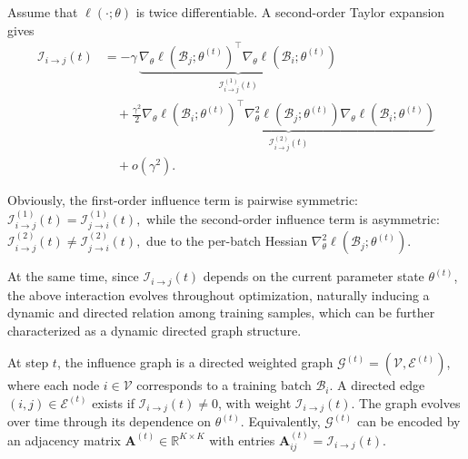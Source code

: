 \begin{tcolorbox}[colback=lightpurple, colframe=lightpurple, sharp corners=all, boxrule=0mm, boxsep=0.5mm, left=1.5mm, right=1.5mm, top=1.5mm, bottom=1.5mm]
\begin{proposition}
\label{prop:influence_properties}
Assume that $\ell(\cdot;\theta)$ is twice differentiable. 
A second-order Taylor expansion gives
{\small
\begin{equation*}
    \begin{aligned} \mathcal{I}_{i \to j}(t) &= -\gamma \, \underbrace{\nabla_\theta \ell(\mathcal{B}_j;\theta^{(t)})^\top \nabla_\theta \ell(\mathcal{B}_i;\theta^{(t)})}_{\mathcal{I}_{i \to j}^{(1)}(t)} \\ &\quad + \frac{\gamma^2}{2} \underbrace{\nabla_\theta \ell(\mathcal{B}_i;\theta^{(t)})^\top \nabla_\theta^2 \ell(\mathcal{B}_j;\theta^{(t)}) \nabla_\theta \ell(\mathcal{B}_i;\theta^{(t)})}_{\mathcal{I}_{i \to j}^{(2)}(t) }\\ &\quad+ o(\gamma^2). \end{aligned}
\end{equation*}
}
\end{proposition} 
\end{tcolorbox}
Obviously, the first-order influence term is pairwise symmetric: 
\(
\mathcal{I}_{i \to j}^{(1)}(t) = \mathcal{I}_{j \to i}^{(1)}(t),
\)
while the second-order influence term is asymmetric: 
\(
\mathcal{I}_{i \to j}^{(2)}(t) \ne \mathcal{I}_{j \to i}^{(2)}(t),
\)
due to the per-batch Hessian $\nabla_\theta^2 \ell(\mathcal{B}_j;\theta^{(t)})$. 

At the same time, since $\mathcal{I}_{i \to j}(t)$ depends on the current parameter state $\theta^{(t)}$, the above interaction evolves throughout optimization, naturally inducing a dynamic and directed relation among training samples, 
which can be further characterized as a dynamic directed graph structure.



\begin{tcolorbox}[colback=lightpurple, colframe=lightpurple, sharp corners=all, boxrule=0mm, boxsep=0.5mm, left=1.5mm, right=1.5mm, top=1.5mm, bottom=1.5mm]
\begin{definition}
\label{def:dynamic_influence_graph}
At step $t$, the influence graph is a
directed weighted graph $\mathcal{G}^{(t)} = (\mathcal{V}, \mathcal{E}^{(t)})$,
where each node $i \in \mathcal{V}$ corresponds to a training batch $\mathcal{B}_i$.
A directed edge $(i,j) \in \mathcal{E}^{(t)}$ exists if
$\mathcal{I}_{i \to j}(t) \neq 0$, with weight
$\mathcal{I}_{i \to j}(t)$.
The graph evolves over time through its dependence on $\theta^{(t)}$.
Equivalently, $\mathcal{G}^{(t)}$ can be encoded by an adjacency matrix
$\mathbf{A}^{(t)} \in \mathbb{R}^{K \times K}$ with entries
\(
\mathbf{A}^{(t)}_{ij} = \mathcal{I}_{i \to j}(t).
\)
\end{definition}
\end{tcolorbox}
